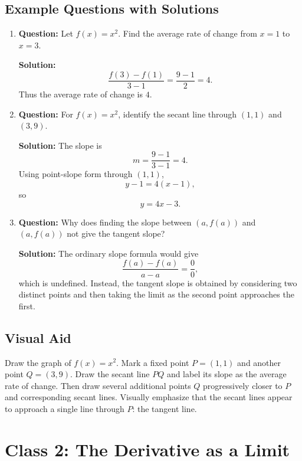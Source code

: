 \documentclass{article}
\begin{document}
\subsection*{Example Questions with Solutions}

\begin{enumerate}
    \item \textbf{Question:} Let $f(x)=x^2$. Find the average rate of change from $x=1$ to $x=3$.

    \textbf{Solution:}
    \[
        \frac{f(3)-f(1)}{3-1}
        =
        \frac{9-1}{2}
        =
        4.
    \]
    Thus the average rate of change is $4$.

    \item \textbf{Question:} For $f(x)=x^2$, identify the secant line through $(1,1)$ and $(3,9)$.

    \textbf{Solution:}
    The slope is
    \[
        m=\frac{9-1}{3-1}=4.
    \]
    Using point-slope form through $(1,1)$,
    \[
        y-1=4(x-1),
    \]
    so
    \[
        y=4x-3.
    \]

    \item \textbf{Question:} Why does finding the slope between $(a,f(a))$ and $(a,f(a))$ not give the tangent slope?

    \textbf{Solution:}
    The ordinary slope formula would give
    \[
        \frac{f(a)-f(a)}{a-a}=\frac{0}{0},
    \]
    which is undefined. Instead, the tangent slope is obtained by considering two distinct points and then taking the limit as the second point approaches the first.
\end{enumerate}

\subsection*{Visual Aid}

\begin{tcolorbox}[title=Instructor Note]
Draw the graph of $f(x)=x^2$. Mark a fixed point $P=(1,1)$ and another point $Q=(3,9)$. Draw the secant line $PQ$ and label its slope as the average rate of change. Then draw several additional points $Q$ progressively closer to $P$ and corresponding secant lines. Visually emphasize that the secant lines appear to approach a single line through $P$: the tangent line.
\end{tcolorbox}

\section*{Class 2: The Derivative as a Limit}
\end{document}
